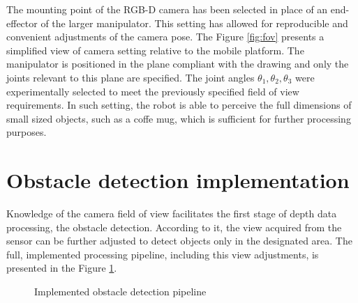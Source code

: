 The mounting point of the RGB-D camera has been selected in place of an end-effector of the larger manipulator. This setting has allowed for reproducible and convenient adjustments of the camera pose. The Figure \ref{fig:fov} presents a simplified view of camera setting relative to the mobile platform. The manipulator is positioned in the plane compliant with the drawing and only the joints relevant to this plane are specified. The joint angles $\theta_1, \theta_2, \theta_3$ were experimentally selected to meet the previously specified field of view requirements. In such setting, the robot is able to perceive the full dimensions of small sized objects, such as a coffe mug, which is sufficient for further processing purposes.




\section{Obstacle detection implementation}
\label{sec:objavoid}

Knowledge of the camera field of view facilitates the first stage of depth data processing, the obstacle detection. According to it, the view acquired from the sensor can be further adjusted to detect objects only in the designated area. The full, implemented processing pipeline, including this view adjustments, is presented in the Figure \ref{fig:detectpipe}.

\begin{figure}[H]
\begin{center}

\caption{Implemented obstacle detection pipeline}

\label{fig:detectpipe}

\end{center}
\end{figure}

